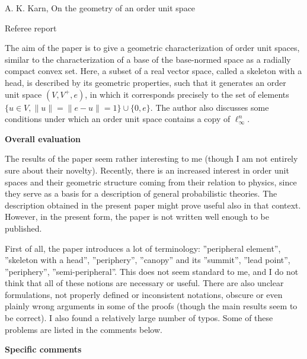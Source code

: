 \documentclass[12pt]{article}
\begin{document}
\begin{center}
{\large A. K. Karn,  On the geometry of an order unit space
 }

\end{center}
\medskip

\centerline{Referee report}

\bigskip

The aim of the paper is to give a geometric characterization of order unit spaces, similar
to the characterization of a base of the base-normed space as a radially compact convex
set. Here, a subset of a real vector space, called a skeleton with a head, is described by
its geometric properties, such that it generates an order unit space $(V,V^+, e)$, in which it
corresponds precisely to the set of elements  $\{u\in V, \|u\|=\|e-u\|=1\}\cup\{0,e\}$. 
The author also discusses some conditions under which an order unit space contains a copy
of $\ell_\infty^n$. 

\medskip
\noindent
\textbf{Overall evaluation}
\medskip

The results of the paper seem rather interesting to me (though I am not entirely sure about their
novelty). Recently, there is an increased interest  in  order unit spaces and their
geometric structure coming from their relation to physics, since  they serve as a basis for a description of general
probabilistic theories. The description obtained in the present
paper might prove useful also in that context. However, in the present form, the paper is not written well
enough to be published. 

\medskip

First of all, the paper introduces a lot of  terminology: ''peripheral element'',
''skeleton with a head'', ''periphery'', ''canopy'' and its ''summit'', ''lead point'',
''periphery'', ''semi-peripheral''. This does not seem standard to me, and I do not think
that all of these notions are necessary or useful. There are also unclear formulations,
not properly defined or inconsistent notations, obscure or even plainly wrong arguments in some of the proofs
(though the main results seem to be correct). I also found a relatively large number of
typos. Some of these problems are listed in the comments below.





\medskip

\noindent
\textbf{Specific comments}
\end{document}
